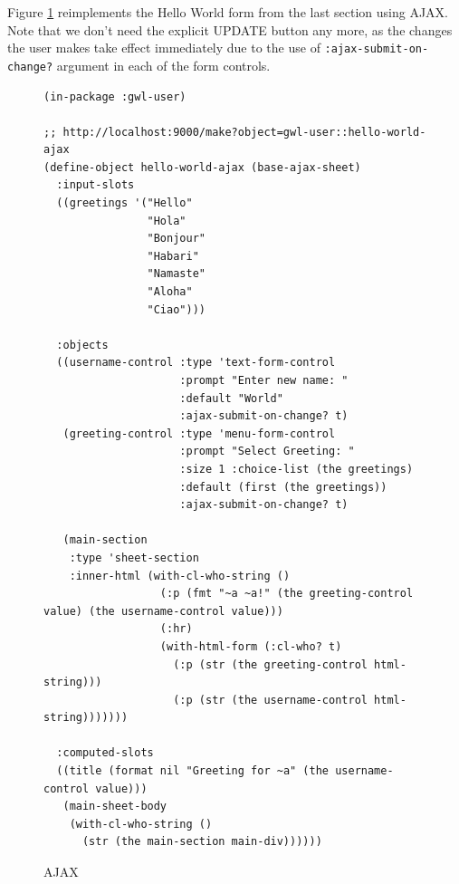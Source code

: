 \documentclass [11pt]{book}
\begin{document}
Figure 
\ref{fig:gwl-hello-world-ajax} reimplements the Hello World form from the last section
using AJAX.  Note that we don't need the explicit UPDATE button any more, as the changes the user makes take effect
immediately due to the use of \texttt{:ajax-submit-on-change?} argument in each of the form controls.
\begin{figure}
\begin{lrbox}{\boxedverb}
\begin{minipage}{\linewidth}
{\small

\begin{verbatim}(in-package :gwl-user)

;; http://localhost:9000/make?object=gwl-user::hello-world-ajax
(define-object hello-world-ajax (base-ajax-sheet)
  :input-slots
  ((greetings '("Hello"
                "Hola"
                "Bonjour"
                "Habari"
                "Namaste"
                "Aloha"
                "Ciao")))

  :objects
  ((username-control :type 'text-form-control
                     :prompt "Enter new name: "
                     :default "World"
                     :ajax-submit-on-change? t)
   (greeting-control :type 'menu-form-control
                     :prompt "Select Greeting: "
                     :size 1 :choice-list (the greetings)
                     :default (first (the greetings))
                     :ajax-submit-on-change? t)

   (main-section
    :type 'sheet-section
    :inner-html (with-cl-who-string ()
                  (:p (fmt "~a ~a!" (the greeting-control value) (the username-control value)))
                  (:hr)
                  (with-html-form (:cl-who? t)
                    (:p (str (the greeting-control html-string)))
                    (:p (str (the username-control html-string)))))))

  :computed-slots
  ((title (format nil "Greeting for ~a" (the username-control value)))
   (main-sheet-body
    (with-cl-who-string ()
      (str (the main-section main-div))))))

\end{verbatim}}
\end{minipage}
\end{lrbox}
\fbox{\usebox{\boxedverb}}

\caption{AJAX}

\label{fig:gwl-hello-world-ajax}

\end{figure}
\end{document}
